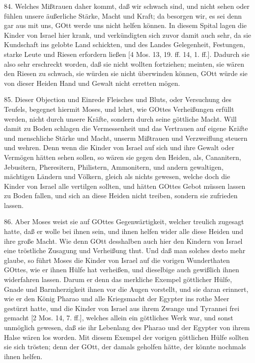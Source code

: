 84. Welches Mißtrauen daher kommt, daß wir schwach sind, und nicht sehen oder fühlen unsere äußerliche Stärke, Macht und Kraft; da besorgen wir, es sei denn gar aus mit uns, GOtt werde uns nicht helfen können. In diesem Spital lagen die Kinder von Israel hier krank, und verkündigten sich zuvor damit auch sehr, da sie Kundschaft ins gelobte Land schickten, und des Landes Gelegenheit, Festungen, starke Leute und Riesen erfordern ließen [4 Mos. 13, 19. ff. 14, 1. ff.]. Dadurch sie also sehr erschreckt worden, daß sie nicht wollten fortziehen; meinten, sie wären den Riesen zu schwach, sie würden sie nicht überwinden können, GOtt würde sie von dieser Heiden Hand und Gewalt nicht erretten mögen.

85. Dieser Objection und Einrede Fleisches und Bluts, oder Versuchung des Teufels, begegnet hiermit Moses, und lehrt, wie GOttes Verheißungen erfüllt werden, nicht durch unsere Kräfte, sondern durch seine göttliche Macht. Will damit zu Boden schlagen die Vermessenheit und das Vertrauen auf eigene Kräfte und menschliche Stärke und Macht, unserm Mißtrauen und Verzweiflung steuern und wehren. Denn wenn die Kinder von Israel auf sich und ihre Gewalt oder Vermögen hätten sehen sollen, so wären sie gegen den Heiden, als, Cananitern, Jebusitern, Pheresitern, Philistern, Ammonitern, und andern gewaltigen, mächtigen Ländern und Völkern, gleich als nichts gewesen, welche doch die Kinder von Israel alle vertilgen sollten, und hätten GOttes Gebot müssen lassen zu Boden fallen, und sich an diese Heiden nicht treiben, sondern sie zufrieden lassen.

86. Aber Moses weist sie auf GOttes Gegenwärtigkeit, welcher treulich zugesagt hatte, daß er wolle bei ihnen sein, und ihnen helfen wider alle diese Heiden und ihre große Macht. Wie denn GOtt desshalben auch hier den Kindern von Israel eine tröstliche Zusagung und Verheißung thut. Und daß man solches desto mehr glaube, so führt Moses die Kinder von Israel auf die vorigen Wunderthaten GOttes, wie er ihnen Hülfe hat verheißen, und dieselbige auch gewißlich ihnen widerfahren lassen. Darum er denn das merkliche Exempel göttlicher Hülfe, Gnade und Barmherzigkeit ihnen vor die Augen vorstellt, und sie daran erinnert, wie er den König Pharao und alle Kriegsmacht der Egypter ins rothe Meer gestürzt hatte, und die Kinder von Israel aus ihrem Zwange und Tyrannei frei gemacht [2 Mos. 14, 7. ff.], welches allein ein göttliches Werk war, und sonst unmöglich gewesen, daß sie ihr Lebenlang des Pharao und der Egypter von ihrem Halse wären los worden. Mit diesem Exempel der vorigen göttlichen Hülfe sollten sie sich trösten; denn der GOtt, der damals geholfen hätte, der könnte nochmals ihnen helfen.

